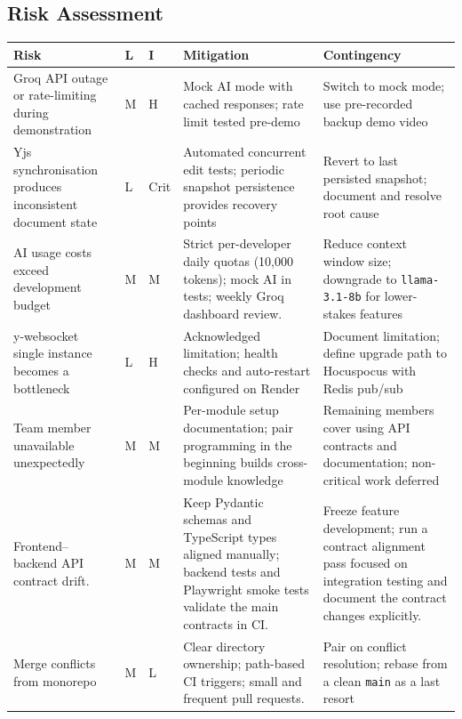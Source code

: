 \documentclass{article}
\begin{document}
\subsection{Risk Assessment}
\noindent
{\small
\begin{tabularx}{\textwidth}{|>{\hsize=0.5\hsize\raggedright\arraybackslash}X|>{\hsize=0.15\hsize\raggedright\arraybackslash}X|>{\hsize=0.15\hsize\raggedright\arraybackslash}X|>{\hsize=0.6\hsize\raggedright\arraybackslash}X|>{\hsize=0.6\hsize\raggedright\arraybackslash}X|}
    \hline
    \rowcolor{tableBlue}
    \textbf{\color{white}Risk} &
    \textbf{\color{white}L} &
    \textbf{\color{white}I} &
    \textbf{\color{white}Mitigation} &
    \textbf{\color{white}Contingency} \\
    \hline
    Groq API outage or rate-limiting during demonstration& M & H & Mock AI mode with cached responses; rate limit tested pre-demo& Switch to mock mode; use pre-recorded backup demo video\\
    \hline
    Yjs synchronisation produces inconsistent document state & L & Crit & Automated concurrent edit tests; periodic snapshot persistence provides recovery points & Revert to last persisted snapshot; document and resolve root cause \\
    \hline
    AI usage costs exceed development budget & M & M & Strict per-developer daily quotas (10,000 tokens); mock AI in tests; weekly Groq dashboard review. & Reduce context window size; downgrade to \texttt{llama-3.1-8b} for lower-stakes features \\
    \hline
    y-websocket single instance becomes a bottleneck& L & H & Acknowledged limitation; health checks and auto-restart configured on Render & Document limitation; define upgrade path to Hocuspocus with Redis pub/sub \\
    \hline
    Team member unavailable unexpectedly & M & M & Per-module setup documentation; pair programming in the beginning builds cross-module knowledge & Remaining members cover using API contracts and documentation; non-critical work deferred \\
    \hline
    Frontend--backend API contract drift. & M & M & Keep Pydantic schemas and TypeScript types aligned manually; backend tests and Playwright smoke tests validate the main contracts in CI. & Freeze feature development; run a contract alignment pass focused on integration testing and document the contract changes explicitly.\\
    \hline
    
    Merge conflicts from monorepo & M & L & Clear directory ownership; path-based CI triggers; small and frequent pull requests. & Pair on conflict resolution; rebase from a clean \texttt{main} as a last resort\\
    \hline
\end{tabularx}
}
\end{document}
